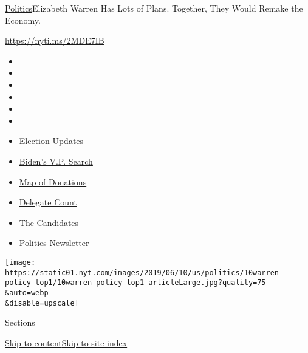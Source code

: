 \href{/section/politics}{Politics}\textbar{}Elizabeth Warren Has Lots of
Plans. Together, They Would Remake the Economy.

\url{https://nyti.ms/2MDE7IB}

\begin{itemize}
\item
\item
\item
\item
\item
\item
\end{itemize}

\begin{itemize}
\item
  \href{https://www.nytimes.com/2020/07/31/us/elections/biden-vs-trump.html?action=click\&pgtype=Article\&state=default\&region=TOP_BANNER\&context=storylines_menu}{Election
  Updates}
\item
  \href{https://www.nytimes.com/article/biden-vice-president-2020.html?action=click\&pgtype=Article\&state=default\&region=TOP_BANNER\&context=storylines_menu}{Biden's
  V.P. Search}
\item
  \href{https://www.nytimes.com/interactive/2020/07/24/us/politics/trump-biden-campaign-donors.html?action=click\&pgtype=Article\&state=default\&region=TOP_BANNER\&context=storylines_menu}{Map
  of Donations}
\item
  \href{https://www.nytimes.com/interactive/2020/us/elections/delegate-count-primary-results.html?action=click\&pgtype=Article\&state=default\&region=TOP_BANNER\&context=storylines_menu}{Delegate
  Count}
\item
  \href{https://www.nytimes.com/interactive/2019/us/politics/2020-presidential-candidates.html?action=click\&pgtype=Article\&state=default\&region=TOP_BANNER\&context=storylines_menu}{The
  Candidates}
\item
  \href{https://www.nytimes.com/newsletters/politics?action=click\&pgtype=Article\&state=default\&region=TOP_BANNER\&context=storylines_menu}{Politics
  Newsletter}
\end{itemize}

\texttt{[image: https://static01.nyt.com/images/2019/06/10/us/politics/10warren-policy-top1/10warren-policy-top1-articleLarge.jpg?quality=75\\\&auto=webp\\\&disable=upscale]}

Sections

\protect\hyperlink{site-content}{Skip to
content}\protect\hyperlink{site-index}{Skip to site index}

